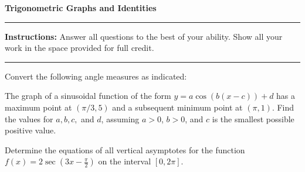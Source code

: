 \documentclass[12pt]{exam}
\newcommand{\examtitle}{Trigonometric Graphs and Identities}
\newcommand{\instructions}{
    \noindent\rule{\textwidth}{0.5pt}
    \begin{center}
    \textbf{Instructions:} Answer all questions to the best of your ability. Show all your work in the space provided for full credit.
    \end{center}
    \noindent\rule{\textwidth}{0.5pt}
}
\begin{document}
\begin{center}
\textbf{\Large \examtitle} \\
\vspace{0.5cm}
\hspace{0.1\textwidth}
\end{center}

\instructions
\vspace{0.5cm}

\begin{questions}

\pointsinrightmargin

\question[10]
Convert the following angle measures as indicated:

\question[10]
The graph of a sinusoidal function of the form $y = a \cos(b(x-c)) + d$ has a maximum point at $(\pi/3, 5)$ and a subsequent minimum point at $(\pi, 1)$. Find the values for $a, b, c,$ and $d$, assuming $a>0$, $b>0$, and $c$ is the smallest possible positive value.
\vspace*{5cm}

\newpage

\question[10]
Determine the equations of all vertical asymptotes for the function $f(x) = 2 \sec(3x - \frac{\pi}{2})$ on the interval $[0, 2\pi]$.
\vspace*{5cm}


\end{questions}
\end{document}
